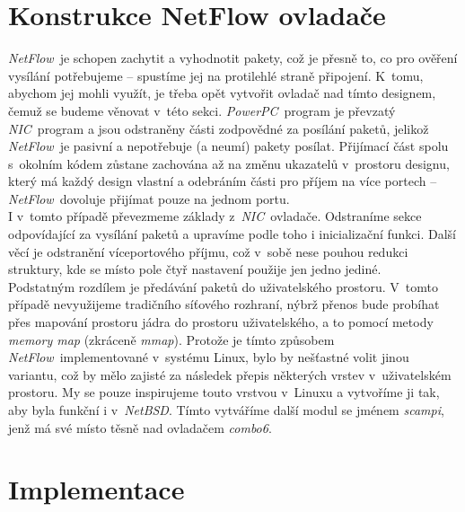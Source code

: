 \documentclass[final,11pt]{fithesis}
\newcommand{\nbsd}{\emph{NetBSD}}
\newcommand{\ppc}{\emph{PowerPC}}
\newcommand{\nflow}{\emph{NetFlow}}
\newcommand{\nic}{\emph{NIC}}
\begin{document}
  \section{Konstrukce NetFlow ovladače}
  \nflow\ je schopen zachytit a vyhodnotit pakety, což je přesně to, co pro
  ověření vysílání potřebujeme -- spustíme jej na protilehlé straně
  připojení. K~tomu, abychom jej mohli využít, je třeba opět vytvořit ovladač
  nad tímto designem, čemuž se budeme věnovat v~této sekci.
  \ppc\ program je převzatý \nic\ program a jsou odstraněny části zodpovědné za
  posílání paketů, jelikož \nflow\ je pasivní a nepotřebuje (a neumí) pakety
  posílat. Přijímací část spolu s~okolním kódem zůstane zachována až na změnu
  ukazatelů v~prostoru designu, který má každý design vlastní a odebráním části
  pro příjem na více portech -- \nflow\ dovoluje přijímat pouze na jednom
  portu. \\ \indent
  I v~tomto případě převezmeme základy z~\nic\ ovladače. Odstraníme sekce
  odpovídající za vysílání
  paketů a upravíme podle toho i inicializační funkci. Další věcí je
  odstranění víceportového příjmu, což v~sobě nese pouhou redukci struktury,
  kde se místo pole čtyř nastavení použije jen jedno jediné. \\ \indent
  Podstatným rozdílem je předávání paketů do uživatelského prostoru. V~tomto
  případě nevyužijeme tradičního síťového rozhraní, nýbrž přenos bude probíhat
  přes
  mapování prostoru jádra do prostoru uživatelského, a to pomocí metody
  \emph{memory map} (zkráceně \emph{mmap}). Protože je tímto způsobem \nflow\
  implementované v~systému Linux, bylo by nešťastné volit jinou variantu, což
  by mělo zajisté za následek přepis některých vrstev v~uživatelském prostoru.
  My se pouze inspirujeme touto vrstvou v~Linuxu a vytvoříme ji tak, aby byla
  funkční i v~\nbsd. Tímto
  vytváříme další modul se jménem \emph{scampi}, jenž má své místo těsně nad
  ovladačem \emph{combo6}.
  \section{Implementace}
\end{document}

